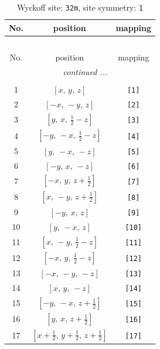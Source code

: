 \documentclass[fleqn,8pt]{jsarticle}
\begin{document}
\renewcommand{\arraystretch}{1.2}
\begin{longtable}{ccc}
\caption{Wyckoff site: {\tt 32m}, site symmetry: {\tt 1}}
 \\
 \hline \hline
No. & position & mapping \\ \hline \endfirsthead

\multicolumn{2}{l}{\tablename\ \thetable{}} \\
 \hline \hline
No. & position & mapping \\ \hline \endhead

 \hline \hline
\multicolumn{2}{r}{\footnotesize\it continued ...} \\ \endfoot

 \hline \hline
\multicolumn{2}{r}{} \\ \endlastfoot

1 & $\left[ x,\, y,\, z \right]$ & {\tt [1]} \\ \hline
2 & $\left[ - x,\, - y,\, z \right]$ & {\tt [2]} \\ \hline
3 & $\left[ y,\, x,\, \frac{1}{2} - z \right]$ & {\tt [3]} \\ \hline
4 & $\left[ - y,\, - x,\, \frac{1}{2} - z \right]$ & {\tt [4]} \\ \hline
5 & $\left[ y,\, - x,\, - z \right]$ & {\tt [5]} \\ \hline
6 & $\left[ - y,\, x,\, - z \right]$ & {\tt [6]} \\ \hline
7 & $\left[ - x,\, y,\, z + \frac{1}{2} \right]$ & {\tt [7]} \\ \hline
8 & $\left[ x,\, - y,\, z + \frac{1}{2} \right]$ & {\tt [8]} \\ \hline
9 & $\left[ - y,\, x,\, z \right]$ & {\tt [9]} \\ \hline
10 & $\left[ y,\, - x,\, z \right]$ & {\tt [10]} \\ \hline
11 & $\left[ x,\, - y,\, \frac{1}{2} - z \right]$ & {\tt [11]} \\ \hline
12 & $\left[ - x,\, y,\, \frac{1}{2} - z \right]$ & {\tt [12]} \\ \hline
13 & $\left[ - x,\, - y,\, - z \right]$ & {\tt [13]} \\ \hline
14 & $\left[ x,\, y,\, - z \right]$ & {\tt [14]} \\ \hline
15 & $\left[ - y,\, - x,\, z + \frac{1}{2} \right]$ & {\tt [15]} \\ \hline
16 & $\left[ y,\, x,\, z + \frac{1}{2} \right]$ & {\tt [16]} \\ \hline
17 & $\left[ x + \frac{1}{2},\, y + \frac{1}{2},\, z + \frac{1}{2} \right]$ & {\tt [17]} \\ \hline

\end{longtable}
\end{document}
